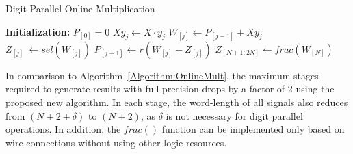 \documentclass[conference]{IEEEtran}
\begin{document}
\begin{algorithm}[tbp]
  \caption{Digit Parallel Online Multiplication}\label{Algorithm:OM_DigitParallel}
  \begin{algorithmic}[1]
    \State \textbf{Initialization:} $P_{[0]}=0$						\vspace{.5ex}
    										\vspace{.5ex}
    	\State $Xy_j \leftarrow X \cdot y_j$						\vspace{.5ex}
    	\State $W_{[j]}    \leftarrow  P_{[j-1]} + Xy_j$			\vspace{.5ex}
     	\State $Z_{[j]}  ~      \leftarrow  sel(W_{[j]})$			\vspace{.5ex}
	 	\State $P_{[j+1]}  \leftarrow  r\left(W_{[j]}-Z_{[j]}\right)$	\vspace{.5ex}
    \EndFor															\vspace{.5ex}
    \State $Z_{[N+1:2N]} \leftarrow frac(W_{[N]})$
  \end{algorithmic}
\end{algorithm}

In comparison to Algorithm~\ref{Algorithm:OnlineMult}, the maximum stages required to generate results with full precision drops by a factor of 2 using the proposed new algorithm. In each stage, the word-length of all signals also reduces from $(N+2+\delta)$ to $(N+2)$, as $\delta$ is not necessary for digit parallel operations. In addition, the $frac()$ function can be implemented only based on wire connections without using other logic resources.
\end{document}
